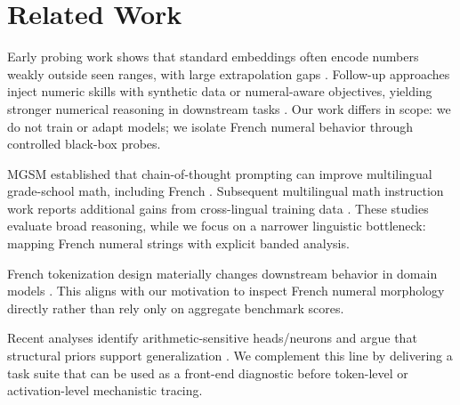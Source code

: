 \section{Related Work}
\label{sec:related_work}
Early probing work shows that standard embeddings often encode numbers weakly outside seen ranges, with large extrapolation gaps \citep{wallace2019nlp}. Follow-up approaches inject numeric skills with synthetic data or numeral-aware objectives, yielding stronger numerical reasoning in downstream tasks \citep{geva2020injecting,jin2021numgpt}. Our work differs in scope: we do not train or adapt models; we isolate French numeral behavior through controlled black-box probes.

MGSM established that chain-of-thought prompting can improve multilingual grade-school math, including French \citep{shi2022language}. Subsequent multilingual math instruction work reports additional gains from cross-lingual training data \citep{chen2024breaking}. These studies evaluate broad reasoning, while we focus on a narrower linguistic bottleneck: mapping French numeral strings with explicit banded analysis.

French tokenization design materially changes downstream behavior in domain models \citep{labrak2024tokenization}. This aligns with our motivation to inspect French numeral morphology directly rather than rely only on aggregate benchmark scores.

Recent analyses identify arithmetic-sensitive heads/neurons and argue that structural priors support generalization \citep{yu2024interpreting,chang2024unraveling}. We complement this line by delivering a task suite that can be used as a front-end diagnostic before token-level or activation-level mechanistic tracing.
